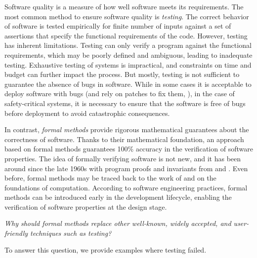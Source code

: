 Software quality is a measure of how well software meets its requirements.
The most common method to ensure software quality is \emph{testing}.
The correct behavior of software is tested empirically for finite number of inputs against a set of assertions that specify the functional requirements of the code.
However, testing has inherent limitations.
Testing can only verify a program against the functional requirements, which may be poorly defined and ambiguous, leading to inadequate testing.
Exhaustive testing of systems is impractical, and constraints on time and budget can further impact the process.
But mostly, testing is not sufficient to guarantee the absence of bugs in software.
While in some cases it is acceptable to deploy software with bugs (and rely on patches to fix them, ), in the case of safety-critical systems, it is necessary to ensure that the software is free of bugs before deployment to avoid catastrophic consequences.

In contrast, \emph{formal methods} provide rigorous mathematical guarantees about the correctness of software.
Thanks to their mathematical foundation, an approach based on formal methods guarantees 100\% accuracy in the verification of software properties.
The idea of formally verifying software is not new, and it has been around since the late 1960s with program proofs and invariants from  and .
Even before, formal methods may be traced back to the work of  and  on the foundations of computation.
According to software engineering practices, formal methods can be introduced early in the development lifecycle, enabling the verification of software properties at the design stage.
%
\begin{center}\em
  Why should formal methods replace other well-known, widely accepted, and user-friendly techniques such as testing?
\end{center}
To answer this question, we provide examples where testing failed.


